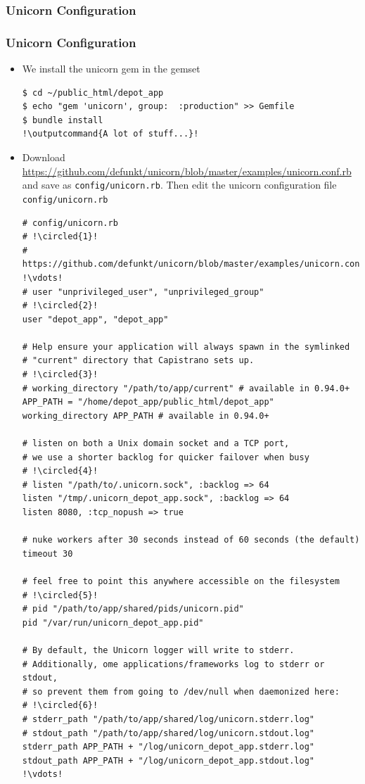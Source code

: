 \documentclass{beamer}
\newcommand*\circled[1]{\tikz[baseline=(char.base)]{
            \node[shape=circle,draw,inner sep=2pt] (char) {#1};}}
\newcommand{\outputcommand}[1]{\color{darkgreen}{#1}}
\begin{document}
\subsubsection{Unicorn Configuration}
\begin{frame}
\frametitle{Unicorn Configuration}

\begin{itemize}
\item  We install the unicorn gem in the gemset

\lstset{language=shell, escapechar=!}
\begin{lstlisting}[escapechar=!]
$ cd ~/public_html/depot_app
$ echo "gem 'unicorn', group:  :production" >> Gemfile
$ bundle install
!\outputcommand{A lot of stuff...}!
\end{lstlisting}

\item Download \href{https://github.com/defunkt/unicorn/blob/master/examples/unicorn.conf.rb}{https://github.com/defunkt/unicorn/blob/master/examples/unicorn.conf.rb}
and save as \texttt{config/unicorn.rb}. Then edit the unicorn configuration file \texttt{config/unicorn.rb}

\lstset{language=shell, numbers=left}
\begin{lstlisting}[escapechar=!]
# config/unicorn.rb
# !\circled{1}!
# https://github.com/defunkt/unicorn/blob/master/examples/unicorn.conf.rb
!\vdots!
# user "unprivileged_user", "unprivileged_group"
# !\circled{2}!
user "depot_app", "depot_app"

# Help ensure your application will always spawn in the symlinked
# "current" directory that Capistrano sets up.
# !\circled{3}!
# working_directory "/path/to/app/current" # available in 0.94.0+
APP_PATH = "/home/depot_app/public_html/depot_app"
working_directory APP_PATH # available in 0.94.0+

# listen on both a Unix domain socket and a TCP port,
# we use a shorter backlog for quicker failover when busy
# !\circled{4}!
# listen "/path/to/.unicorn.sock", :backlog => 64
listen "/tmp/.unicorn_depot_app.sock", :backlog => 64
listen 8080, :tcp_nopush => true

# nuke workers after 30 seconds instead of 60 seconds (the default)
timeout 30

# feel free to point this anywhere accessible on the filesystem
# !\circled{5}!
# pid "/path/to/app/shared/pids/unicorn.pid"
pid "/var/run/unicorn_depot_app.pid"

# By default, the Unicorn logger will write to stderr.
# Additionally, ome applications/frameworks log to stderr or stdout,
# so prevent them from going to /dev/null when daemonized here:
# !\circled{6}!
# stderr_path "/path/to/app/shared/log/unicorn.stderr.log"
# stdout_path "/path/to/app/shared/log/unicorn.stdout.log"
stderr_path APP_PATH + "/log/unicorn_depot_app.stderr.log"
stdout_path APP_PATH + "/log/unicorn_depot_app.stdout.log"
!\vdots!                                                                      
\end{lstlisting}


\end{itemize}
\end{frame}
\end{document}
